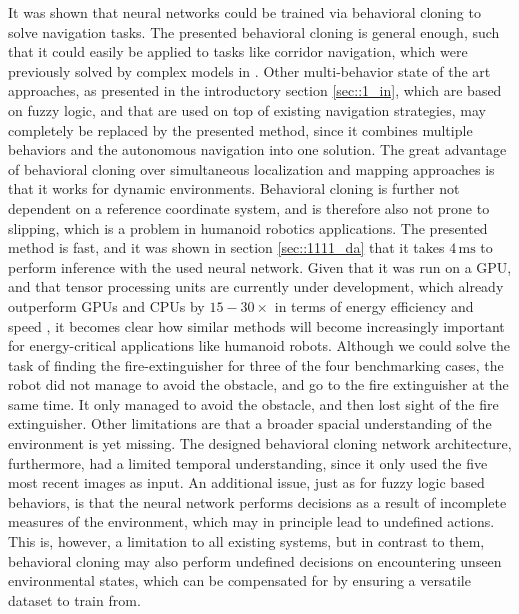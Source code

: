 It was shown that neural networks could be trained via behavioral cloning to solve navigation tasks. The presented behavioral cloning is general enough, such that it could easily be applied to tasks like corridor navigation, which were previously solved by complex models in \cite{faragasso2013vision}. Other multi-behavior state of the art approaches, as presented in the introductory section \ref{sec::1_in}, which are based on fuzzy logic, and that are used on top of existing navigation strategies, may completely be replaced by the presented method, since it combines multiple behaviors and the autonomous navigation into one solution. The great advantage of behavioral cloning over simultaneous localization and mapping approaches is that it works for dynamic environments. Behavioral cloning is further not dependent on a reference coordinate system, and is therefore also not prone to slipping, which is a problem in humanoid robotics applications. The presented method is fast, and it was shown in section \ref{sec::1111_da} that it takes $4\,\text{ms}$ to perform inference with the used neural network. Given that it was run on a GPU, and that tensor processing units are currently under development, which already outperform GPUs and CPUs by $15-30\times$ in terms of energy efficiency and speed \cite{jouppi2017datacenter}, it becomes clear how similar methods will become increasingly important for energy-critical applications like humanoid robots. Although we could solve the task of finding the fire-extinguisher for three of the four benchmarking cases, the robot did not manage to avoid the obstacle, and go to the fire extinguisher at the same time. It only managed to avoid the obstacle, and then lost sight of the fire extinguisher. Other limitations are that a broader spacial understanding of the environment is yet missing. The designed behavioral cloning network architecture, furthermore, had a limited temporal understanding, since it only used the five most recent images as input. An additional issue, just as for fuzzy logic based behaviors, is that the neural network performs decisions as a result of incomplete measures of the environment, which may in principle lead to undefined actions. This is, however, a limitation to all existing systems, but in contrast to them, behavioral cloning may also perform undefined decisions on encountering unseen environmental states, which can be compensated for by ensuring a versatile dataset to train from.\\\\
